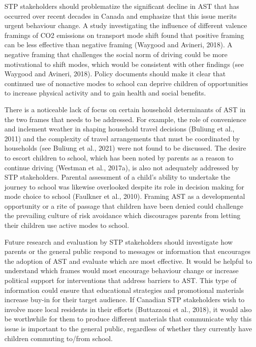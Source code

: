 \documentclass[]{elsarticle} %
\begin{document}
STP stakeholders should problematize the significant decline in AST that
has occurred over recent decades in Canada and emphasize that this issue
merits urgent behaviour change. A study investigating the influence of
different valence framings of CO2 emissions on transport mode shift
found that positive framing can be less effective than negative framing
(Waygood and Avineri, 2018). A negative framing that challenges the
social norm of driving could be more motivational to shift modes, which
would be consistent with other findings (see Waygood and Avineri, 2018).
Policy documents should make it clear that continued use of nonactive
modes to school can deprive children of opportunities to increase
physical activity and to gain health and social benefits.

There is a noticeable lack of focus on certain household determinants of
AST in the two frames that needs to be addressed. For example, the role
of convenience and inclement weather in shaping household travel
decisions (Buliung et al., 2011) and the complexity of travel
arrangements that must be coordinated by households (see Buliung et al.,
2021) were not found to be discussed. The desire to escort children to
school, which has been noted by parents as a reason to continue driving
(Westman et al., 2017a), is also not adequately addressed by STP
stakeholders. Parental assessment of a child's ability to undertake the
journey to school was likewise overlooked despite its role in decision
making for mode choice to school (Faulkner et al., 2010). Framing AST as
a developmental opportunity or a rite of passage that children have been
denied could challenge the prevailing culture of risk avoidance which
discourages parents from letting their children use active modes to
school.

Future research and evaluation by STP stakeholders should investigate
how parents or the general public respond to messages or information
that encourages the adoption of AST and evaluate which are most
effective. It would be helpful to understand which frames would most
encourage behaviour change or increase political support for
interventions that address barriers to AST. This type of information
could ensure that educational strategies and promotional materials
increase buy-in for their target audience. If Canadian STP stakeholders
wish to involve more local residents in their efforts (Buttazzoni et
al., 2018), it would also be worthwhile for them to produce different
materials that communicate why this issue is important to the general
public, regardless of whether they currently have children commuting
to/from school.
\end{document}
